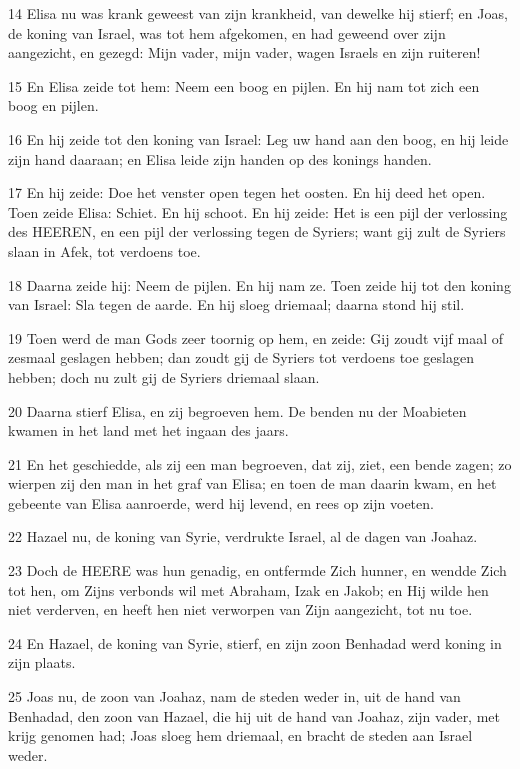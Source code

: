 \par 14 Elisa nu was krank geweest van zijn krankheid, van dewelke hij stierf; en Joas, de koning van Israel, was tot hem afgekomen, en had geweend over zijn aangezicht, en gezegd: Mijn vader, mijn vader, wagen Israels en zijn ruiteren!
\par 15 En Elisa zeide tot hem: Neem een boog en pijlen. En hij nam tot zich een boog en pijlen.
\par 16 En hij zeide tot den koning van Israel: Leg uw hand aan den boog, en hij leide zijn hand daaraan; en Elisa leide zijn handen op des konings handen.
\par 17 En hij zeide: Doe het venster open tegen het oosten. En hij deed het open. Toen zeide Elisa: Schiet. En hij schoot. En hij zeide: Het is een pijl der verlossing des HEEREN, en een pijl der verlossing tegen de Syriers; want gij zult de Syriers slaan in Afek, tot verdoens toe.
\par 18 Daarna zeide hij: Neem de pijlen. En hij nam ze. Toen zeide hij tot den koning van Israel: Sla tegen de aarde. En hij sloeg driemaal; daarna stond hij stil.
\par 19 Toen werd de man Gods zeer toornig op hem, en zeide: Gij zoudt vijf maal of zesmaal geslagen hebben; dan zoudt gij de Syriers tot verdoens toe geslagen hebben; doch nu zult gij de Syriers driemaal slaan.
\par 20 Daarna stierf Elisa, en zij begroeven hem. De benden nu der Moabieten kwamen in het land met het ingaan des jaars.
\par 21 En het geschiedde, als zij een man begroeven, dat zij, ziet, een bende zagen; zo wierpen zij den man in het graf van Elisa; en toen de man daarin kwam, en het gebeente van Elisa aanroerde, werd hij levend, en rees op zijn voeten.
\par 22 Hazael nu, de koning van Syrie, verdrukte Israel, al de dagen van Joahaz.
\par 23 Doch de HEERE was hun genadig, en ontfermde Zich hunner, en wendde Zich tot hen, om Zijns verbonds wil met Abraham, Izak en Jakob; en Hij wilde hen niet verderven, en heeft hen niet verworpen van Zijn aangezicht, tot nu toe.
\par 24 En Hazael, de koning van Syrie, stierf, en zijn zoon Benhadad werd koning in zijn plaats.
\par 25 Joas nu, de zoon van Joahaz, nam de steden weder in, uit de hand van Benhadad, den zoon van Hazael, die hij uit de hand van Joahaz, zijn vader, met krijg genomen had; Joas sloeg hem driemaal, en bracht de steden aan Israel weder.

